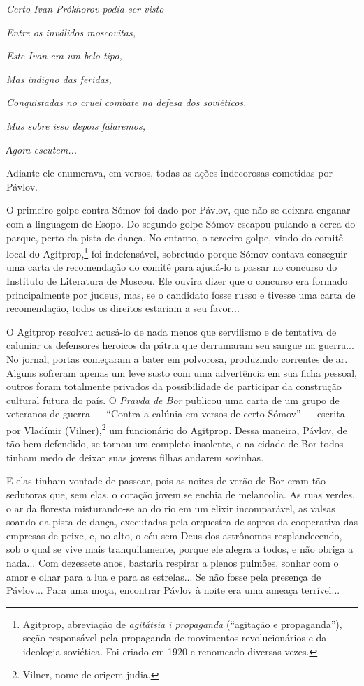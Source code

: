 \emph{Certo Ivan Prókhorov podia ser visto}

\emph{Entre os inválidos moscovitas,}

\emph{Este Ivan era um belo tipo, }

\emph{Mas indigno das feridas,}

\emph{Conquistadas no cruel combate na defesa dos soviéticos.}

\emph{Mas sobre isso depois falaremos, }

\emph{Аgora escutem...}

Adiante ele enumerava, em versos, todas as ações indecorosas cometidas
por Pávlov.

O primeiro golpe contra Sómov foi dado por Pávlov, que não se deixara
enganar com a linguagem de Esopo. Do segundo golpe Sómov escapou pulando
a cerca do parque, perto da pista de dança. No entanto, o terceiro
golpe, vindo do comitê local dо Agitprop,\footnote{Agitprop, abreviação
  de \emph{agitátsia i propaganda} (``agitação e propaganda''), seção
  responsável pela propaganda de movimentos revolucionários e da
  ideologia soviética. Foi criado em 1920 e renomeado diversas vezes.}
foi indefensável, sobretudo porque Sómov contava conseguir uma carta de
recomendação do comitê para ajudá-lo a passar no concurso do Instituto
de Literatura de Moscou. Ele ouvira dizer que o concurso era formado
principalmente por judeus, mas, se o candidato fosse russo e tivesse uma
carta de recomendação, todos os direitos estariam a seu favor...

O Agitprop resolveu acusá-lo de nada menos que servilismo e de tentativa
de caluniar os defensores heroicos da pátria que derramaram seu sangue
na guerra... No jornal, portas começaram a bater em polvorosa,
produzindo correntes de ar. Alguns sofreram apenas um leve susto com uma
advertência em sua ficha pessoal, outros foram totalmente privados da
possibilidade de participar da construção cultural futura do país. O
\emph{Pravda de Bor} publicou uma carta de um grupo de veteranos de
guerra --- ``Contra a calúnia em versos de certo Sómov'' --- escrita por
Vladímir (Vilner),\footnote{Vilner, nome de origem judia.} um
funcionário do Agitprop. Dessa maneira, Pávlov, de tão bem defendido, se
tornou um completo insolente, e na cidade de Bor todos tinham medo de
deixar suas jovens filhas andarem sozinhas.

E elas tinham vontade de passear, pois as noites de verão de Bor eram
tão sedutoras que, sem elas, o coração jovem se enchia de melancolia. As
ruas verdes, o ar da floresta misturando-se ao do rio em um elixir
incomparável, as valsas soando da pista de dança, executadas pela
orquestra de sopros da cooperativa das empresas de peixe, e, no alto, o
céu sem Deus dos astrônomos resplandecendo, sob o qual se vive mais
tranquilamente, porque ele alegra a todos, e não obriga a nada... Com
dezessete anos, bastaria respirar a plenos pulmões, sonhar com o amor e
olhar para a lua e para as estrelas... Se não fosse pela presença de
Pávlov... Para uma moça, encontrar Pávlov à noite era uma ameaça
terrível...

